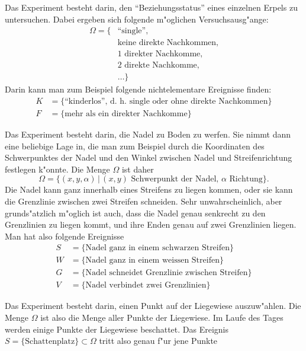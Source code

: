 \begin{loesung}
\begin{teilaufgaben}
\item Das Experiment besteht darin, den ``Beziehungsstatus'' eines
einzelnen Erpels zu untersuchen. Dabei ergeben sich folgende m"oglichen
Versuchsausg"ange:
\begin{align*}
\Omega=\{&\text{``single''},\\
&\text{keine direkte Nachkommen},\\
&\text{1 direkter Nachkomme},\\
&\text{2 direkte Nachkomme},\\
&\dots \}
\end{align*}
Darin kann man zum Beispiel folgende nichtelementare Ereignisse finden:
\begin{align*}
K&=\{\text{``kinderlos'', d.~h.~single oder ohne direkte Nachkommen}\}\\
F&=\{\text{mehr als ein direkter Nachkomme}\}
\end{align*}
\item
Das Experiment besteht darin, die Nadel zu Boden zu werfen. Sie nimmt dann
eine beliebige Lage in, die man zum Beispiel durch die Koordinaten
des Schwerpunktes der Nadel und den Winkel zwischen Nadel und Streifenrichtung
festlegen k"onnte. Die Menge $\Omega$ ist daher
\[
\Omega=\{ (x,y,\alpha) \,|\, \text{$(x,y)$ Schwerpunkt der Nadel, $\alpha$ Richtung}\}.
\]
Die Nadel kann ganz innerhalb eines Streifens zu liegen kommen, oder sie
kann die Grenzlinie zwischen zwei Streifen schneiden. Sehr unwahrscheinlich,
aber grunds"atzlich m"oglich ist auch, dass die Nadel genau senkrecht
zu den Grenzlinien zu liegen kommt, und ihre Enden genau auf zwei Grenzlinien
liegen. Man hat also folgende Ereignisse
\begin{align*}
S&=\{ \text{Nadel ganz in einem schwarzen Streifen}\}\\
W&=\{ \text{Nadel ganz in einem weissen Streifen}\}\\
G&=\{ \text{Nadel schneidet Grenzlinie zwischen Streifen}\}\\
V&=\{ \text{Nadel verbindet zwei Grenzlinien}\}
\end{align*}
\item
Das Experiment besteht darin, einen Punkt auf der Liegewiese auszuw"ahlen.
Die Menge $\Omega$ ist also die Menge aller Punkte der Liegewiese.
Im Laufe des Tages werden einige Punkte der Liegewiese beschattet.
Das Ereignis $S=\{\text{Schattenplatz}\}\subset\Omega$
tritt also genau f"ur jene Punkte

\end{teilaufgaben}
\end{loesung}
